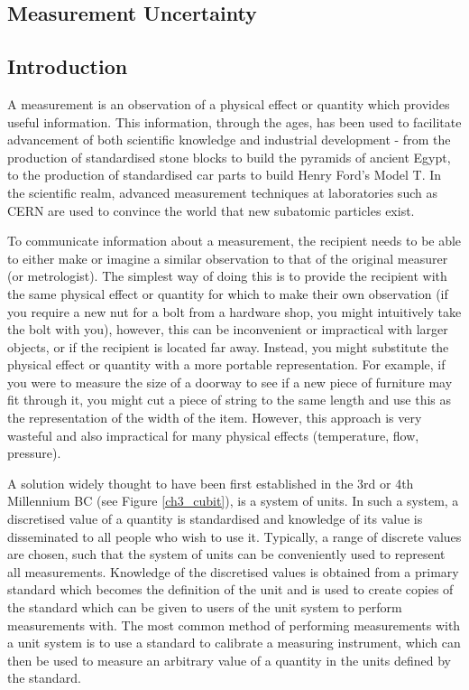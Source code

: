 \documentclass[../thesis.tex]{subfiles}
\begin{document}
\begin{refsection}
\chapter{Measurement Uncertainty}
\section{Introduction}

A measurement is an observation of a physical effect or quantity which provides useful information. This information, through the ages, has been used to facilitate advancement of both scientific knowledge and industrial development - from the production of standardised stone blocks to build the pyramids of ancient Egypt, to the production of standardised car parts to build Henry Ford's Model T. In the scientific realm, advanced measurement techniques at laboratories such as CERN are used to convince the world that new subatomic particles exist.

To communicate information about a measurement, the recipient needs to be able to either make or imagine a similar observation to that of the original measurer (or metrologist). The simplest way of doing this is to provide the recipient with the same physical effect or quantity for which to make their own observation (if you require a new nut for a bolt from a hardware shop, you might intuitively take the bolt with you), however, this can be inconvenient or impractical with larger objects, or if the recipient is located far away. Instead, you might substitute the physical effect or quantity with a more portable representation. For example, if you were to measure the size of a doorway to see if a new piece of furniture may fit through it, you might cut a piece of string to the same length and use this as the representation of the width of the item. However, this approach is very wasteful and also impractical for many physical effects (temperature, flow, pressure).

A solution widely thought to have been first established in the 3rd or 4th Millennium BC (see Figure \ref{ch3_cubit}), is a system of units. In such a system, a discretised value of a quantity is standardised and knowledge of its value is disseminated to all people who wish to use it. Typically, a range of discrete values are chosen, such that the system of units can be conveniently used to represent all measurements. Knowledge of the discretised values is obtained from a primary standard which becomes the definition of the unit and is used to create copies of the standard which can be given to users of the unit system to perform measurements with. The most common method of performing measurements with a unit system is to use a standard to calibrate a measuring instrument, which can then be used to measure an arbitrary value of a quantity in the units defined by the standard.


\end{refsection}
\end{document}
